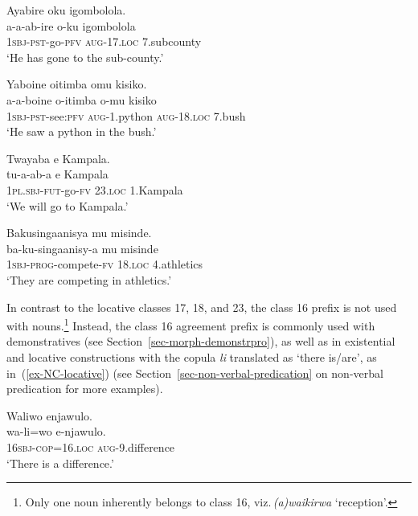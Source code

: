 \ea \label{ex-NC-locative-all}
\begin{xlist}
\ex \label{ex-NC-locative-ku}
  \glll Ayabire oku igombolola.\\
a-a-ab-ire o-ku igombolola\\
\textsc{1sbj}-\textsc{pst}-go-\textsc{pfv} \textsc{aug}-17.\textsc{loc} 7.subcounty\\
\glt `He has gone to the sub-county.'

\ex \label{ex-NC-locative-mu}
  \glll Yaboine oitimba omu kisiko.\\
a-a-boine o-itimba o-mu kisiko\\
\textsc{1sbj}-\textsc{pst}-see:\textsc{pfv} \textsc{aug}-1.python \textsc{aug}-18.\textsc{loc} 7.bush\\
\glt `He saw a python in the bush.'

\ex \label{ex-NC-locative-e}
  \glll Twayaba e Kampala.\\
tu-a-ab-a e Kampala\\
1\textsc{pl.sbj}-\textsc{fut}-go-\textsc{fv} 23.\textsc{loc} 1.Kampala\\
\glt `We will go to Kampala.'

\ex \label{ex-NC-locative-mu2}
  \glll Bakusingaanisya mu misinde.\\
ba-ku-singaanisy-a mu misinde\\
\textsc{1sbj}-\textsc{prog}-compete-\textsc{fv} 18.\textsc{loc} 4.athletics\\
\glt `They are competing in athletics.'
\end{xlist}
\z
	
In contrast to the locative classes 17, 18, and 23, the class 16 prefix is not used with nouns.\footnote{Only one noun inherently belongs to class 16, viz.\,\textit{(a)waikirwa} `reception'.} 
Instead, the class 16 agreement prefix is commonly used with demonstratives (see Section~\ref{sec-morph-demonstrpro}), as well as in existential and locative constructions with the copula \textit{li} translated as `there is/are', as in~(\ref{ex-NC-locative}) (see Section~\ref{sec-non-verbal-predication} on non-verbal predication for more examples).

\ea \label{ex-NC-locative}
\label{ex-ruulilocstrange}
  \glll Waliwo enjawulo.\\
wa-li=wo e-njawulo.\\
	1\textsc{6sbj}-\textsc{cop}=16.\textsc{loc} \textsc{aug}-9.difference\\
\glt `There is a difference.'
\z


